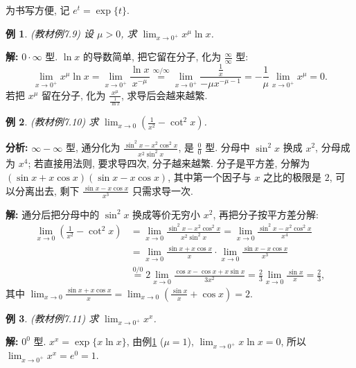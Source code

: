 \documentclass[UTF8,openany]{ctexbook}
\theoremstyle{chinesetextbook}
\newtheorem{example}{例}[section]
\newenvironment{cnsolution}{\par\indent\textbf{解:} \ignorespaces}{\par}
\begin{document}
为书写方便, 记 $e^t=\exp\{t\}$.
\begin{example}\label{ex:c2-7-9}
\textnormal{(教材例7.9)} 设 $\mu>0$, 求 $\displaystyle\lim_{x\to0^+}x^\mu\ln x$.
\end{example}
\begin{cnsolution}
$0\cdot\infty$ 型. $\ln x$ 的导数简单, 把它留在分子, 化为 $\displaystyle\frac\infty\infty$ 型:
\[
\lim_{x\to0^+}x^\mu\ln x=\lim_{x\to0^+}\frac{\ln x}{x^{-\mu}}\overset{\infty/\infty}{=}\lim_{x\to0^+}\frac{\frac1x}{-\mu x^{-\mu-1}}=-\frac1\mu\lim_{x\to0^+}x^\mu=0.
\]
若把 $x^\mu$ 留在分子, 化为 $\displaystyle\frac{x^\mu}{\frac1{\ln x}}$, 求导后会越来越繁.
\end{cnsolution}
\begin{example}\label{ex:c2-7-10}
\textnormal{(教材例7.10)} 求 $\displaystyle\lim_{x\to0}\left(\frac1{x^2}-\cot^2x\right)$.
\end{example}
\par\indent\textbf{分析:} $\infty-\infty$ 型, 通分化为 $\displaystyle\frac{\sin^2x-x^2\cos^2x}{x^2\sin^2x}$, 是 $\displaystyle\frac00$ 型. 分母中 $\sin^2x$ 换成 $x^2$, 分母成为 $x^4$; 若直接用法则, 要求导四次, 分子越来越繁. 分子是平方差, 分解为 $(\sin x+x\cos x)(\sin x-x\cos x)$, 其中第一个因子与 $x$ 之比的极限是 $2$, 可以分离出去, 剩下 $\displaystyle\frac{\sin x-x\cos x}{x^3}$ 只需求导一次.
\begin{cnsolution}
通分后把分母中的 $\sin^2x$ 换成等价无穷小 $x^2$, 再把分子按平方差分解:
\[
\begin{aligned}
\lim_{x\to0}\left(\frac1{x^2}-\cot^2x\right)&=\lim_{x\to0}\frac{\sin^2x-x^2\cos^2x}{x^2\sin^2x}=\lim_{x\to0}\frac{\sin^2x-x^2\cos^2x}{x^4}\\
&=\lim_{x\to0}\frac{\sin x+x\cos x}x\cdot\lim_{x\to0}\frac{\sin x-x\cos x}{x^3}\\
&\overset{0/0}{=}2\lim_{x\to0}\frac{\cos x-\cos x+x\sin x}{3x^2}=\frac23\lim_{x\to0}\frac{\sin x}x=\frac23,
\end{aligned}
\]
其中 $\displaystyle\lim_{x\to0}\frac{\sin x+x\cos x}x=\lim_{x\to0}\left(\frac{\sin x}x+\cos x\right)=2$.
\end{cnsolution}
\begin{example}\label{ex:c2-7-11}
\textnormal{(教材例7.11)} 求 $\displaystyle\lim_{x\to0^+}x^x$.
\end{example}
\begin{cnsolution}
$0^0$ 型. $x^x=\exp\{x\ln x\}$, 由例\ref{ex:c2-7-9} ($\mu=1$), $\displaystyle\lim_{x\to0^+}x\ln x=0$, 所以 $\displaystyle\lim_{x\to0^+}x^x=e^0=1$.
\end{cnsolution}
\end{document}
